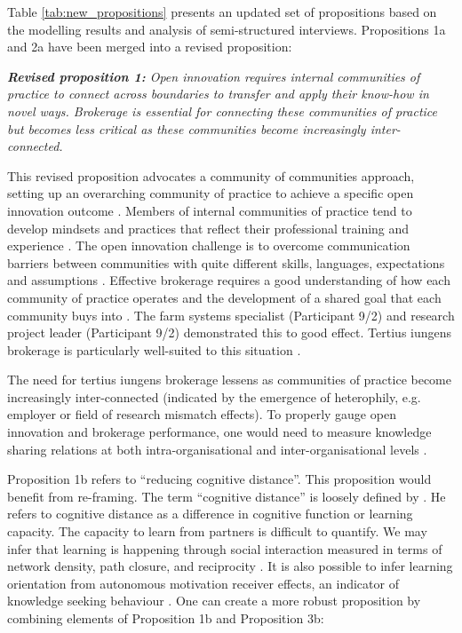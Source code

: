 Table \ref{tab:new_propositions} presents an updated set of propositions based on the modelling results and analysis of semi-structured interviews. Propositions 1a and 2a have been merged into a revised proposition: \bigskip

\begin{tcolorbox}
\textit{\textbf{Revised proposition 1:} Open innovation requires internal communities of practice to connect across boundaries to transfer and apply their know-how in novel ways. Brokerage is essential for connecting these communities of practice but becomes less critical as these communities become increasingly inter-connected.} 
\end{tcolorbox}

This revised proposition advocates a community of communities approach, setting up an overarching community of practice to achieve a specific open innovation outcome \citep{palla2005uncovering, west2008getting, sytch2013exploring, dumbach2014establishing}. Members of internal communities of practice tend to develop mindsets and practices that reflect their professional training and experience \citep{garrety2004integrating,wenger2011communities}. The open innovation challenge is to overcome communication barriers between communities with quite different skills, languages, expectations and assumptions \citep{fleming2007brokerage,chesbrough2012open}. Effective brokerage requires a good understanding of how each community of practice operates and the development of a shared goal that each community buys into \citep{garrety2004integrating,adler2008perspective,hargadon2014brokerage,kwon2020network}. The farm systems specialist (Participant 9/2) and research project leader (Participant 9/2) demonstrated this to good effect. Tertius iungens brokerage is particularly well-suited to this situation \citep{obstfeld2014brokerage, quintane2016brokers, grosser2019measuring}. \medskip

The need for tertius iungens brokerage lessens as communities of practice become increasingly inter-connected (indicated by the emergence of heterophily, e.g. employer or field of research mismatch effects). To properly gauge open innovation and brokerage performance, one would need to measure knowledge sharing relations at both intra-organisational and inter-organisational levels \citep{jasny2015two}. \medskip

Proposition 1b refers to \enquote{reducing cognitive distance}. This proposition would benefit from re-framing. The term \enquote{cognitive distance} is loosely defined by \citet{nooteboom2000learning}. He refers to cognitive distance as a difference in cognitive function or learning capacity. The capacity to learn from partners is difficult to quantify. We may infer that learning is happening through social interaction measured in terms of network density, path closure, and reciprocity \citep{reagans2003network, marsden2012reflections, phelps2012knowledge}. It is also possible to infer learning orientation from autonomous motivation receiver effects, an indicator of knowledge seeking behaviour \citep{gagne2009model,gubbins2021delineating}. One can create a more robust proposition by combining elements of Proposition 1b and Proposition 3b: \bigskip

